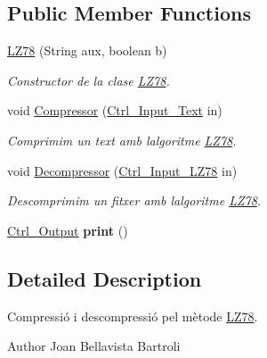 \subsection*{Public Member Functions}
\begin{DoxyCompactItemize}
\item 
\hyperlink{classdomini_1_1algorithm_1_1LZ78_afb5950cfc6a4887611298f6c1fd83d26}{L\+Z78} (String aux, boolean b)
\begin{DoxyCompactList}\small\item\em Constructor de la clase \hyperlink{classdomini_1_1algorithm_1_1LZ78}{L\+Z78}. \end{DoxyCompactList}\item 
void \hyperlink{classdomini_1_1algorithm_1_1LZ78_a545765a19a5eeababaeeee20fc480116}{Compressor} (\hyperlink{classpersistencia_1_1input_1_1Ctrl__Input__Text}{Ctrl\+\_\+\+Input\+\_\+\+Text} in)
\begin{DoxyCompactList}\small\item\em Comprimim un text amb l\textquotesingle{}algoritme \hyperlink{classdomini_1_1algorithm_1_1LZ78}{L\+Z78}. \end{DoxyCompactList}\item 
void \hyperlink{classdomini_1_1algorithm_1_1LZ78_a9dee2b172b79054a9312b47abce7002c}{Decompressor} (\hyperlink{classpersistencia_1_1input_1_1Ctrl__Input__LZ78}{Ctrl\+\_\+\+Input\+\_\+\+L\+Z78} in)
\begin{DoxyCompactList}\small\item\em Descomprimim un fitxer amb l\textquotesingle{}algoritme \hyperlink{classdomini_1_1algorithm_1_1LZ78}{L\+Z78}. \end{DoxyCompactList}\item 
\mbox{\label{classdomini_1_1algorithm_1_1LZ78_a239b2ae4a570ad47fc7f754a321ffc2f}} 
\hyperlink{classpersistencia_1_1output_1_1Ctrl__Output}{Ctrl\+\_\+\+Output} {\bfseries print} ()
\end{DoxyCompactItemize}


\subsection{Detailed Description}
Compressió i descompressió pel mètode \hyperlink{classdomini_1_1algorithm_1_1LZ78}{L\+Z78}. 

\begin{DoxyAuthor}{Author}
Joan Bellavista Bartroli 
\end{DoxyAuthor}


